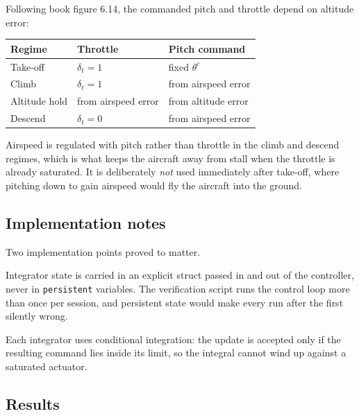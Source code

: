 \documentclass[11pt,a4paper]{article}
\newcommand{\dt}{\delta_t}
\begin{document}
Following book figure 6.14, the commanded pitch and throttle depend on altitude
error:

\begin{center}
\begin{tabular}{lll}
\toprule
Regime & Throttle & Pitch command \\
\midrule
Take-off & $\dt = 1$ & fixed $\theta^c$ \\
Climb & $\dt = 1$ & from airspeed error \\
Altitude hold & from airspeed error & from altitude error \\
Descend & $\dt = 0$ & from airspeed error \\
\bottomrule
\end{tabular}
\end{center}

Airspeed is regulated with pitch rather than throttle in the climb and descend
regimes, which is what keeps the aircraft away from stall when the throttle is
already saturated. It is deliberately \emph{not} used immediately after take-off,
where pitching down to gain airspeed would fly the aircraft into the ground.

\subsection{Implementation notes}

Two implementation points proved to matter.

Integrator state is carried in an explicit struct passed in and out of the
controller, never in \texttt{persistent} variables. The verification script runs
the control loop more than once per session, and persistent state would make every
run after the first silently wrong.

Each integrator uses conditional integration: the update is accepted only if the
resulting command lies inside its limit, so the integral cannot wind up against a
saturated actuator.

\subsection{Results}

\begin{table}[htbp]
\centering

\caption{Autopilot gains from the section 6.4 formulas, with
$\zeta_\theta = 0.707$, $W_h = W_{V_2} = 10$, $\zeta_h = \zeta_{V_2} = 0.9$,
$\omega_{n_V} = 0.5$.}
\label{tab:gains}
\end{table}
\end{document}
